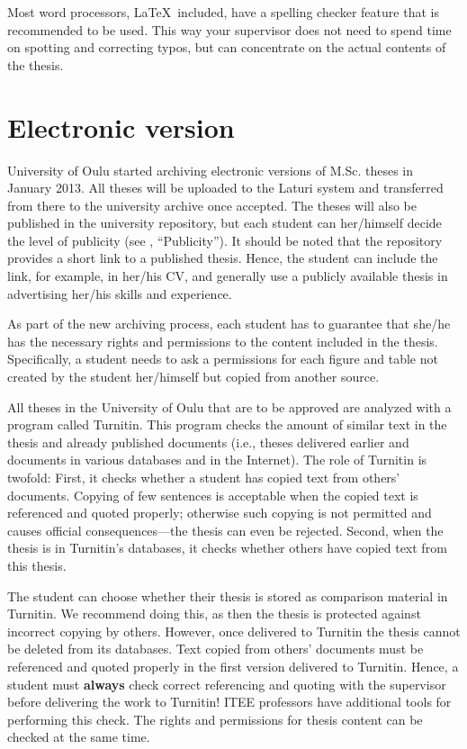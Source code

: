 Most word processors, \LaTeX\ included, have a spelling checker
feature that is recommended to be used. This way your supervisor does
not need to spend time on spotting and correcting typos, but can
concentrate on the actual contents of the thesis.

\section{Electronic version}

University of Oulu started archiving electronic versions of M.Sc.
theses in January 2013. All theses will be uploaded to the Laturi
system and transferred from there to the university archive once
accepted. The theses will also be published in the university
repository, but each student can her/himself decide the level of
publicity (see , “Publicity”). It should be
noted that the repository provides a short link to a published
thesis. Hence, the student can include the link, for example, in
her/his CV, and generally use a publicly available thesis in
advertising her/his skills and experience.

As part of the new archiving process, each student has to guarantee
that she/he has the necessary rights and permissions to the content
included in the thesis. Specifically, a student needs to ask a
permissions for each figure and table not created by the student
her/himself but copied from another source.

All theses in the University of Oulu that are to be approved are
analyzed with a program called Turnitin. This program checks the
amount of similar text in the thesis and already published documents
(i.e., theses delivered earlier and documents in various databases and
in the Internet). The role of Turnitin is twofold: First, it checks
whether a student has copied text from others’ documents. Copying of
few sentences is acceptable when the copied text is referenced and
quoted properly; otherwise such copying is not permitted and causes
official consequences---the thesis can even be rejected. Second, when
the thesis is in Turnitin’s databases, it checks whether others have
copied text from this thesis.

The student can choose whether their thesis is stored as comparison material
in Turnitin. We recommend doing this, as then
the thesis is protected against incorrect copying by others. However,
once delivered to Turnitin the thesis cannot be deleted from its
databases. Text copied from others’ documents must be referenced
and quoted properly in the first version delivered to Turnitin.
Hence, a student must \textbf{always} check correct referencing and
quoting with the supervisor before delivering the work to Turnitin!
ITEE professors have additional tools for performing this check. The
rights and permissions for thesis content can be checked at the same time.

